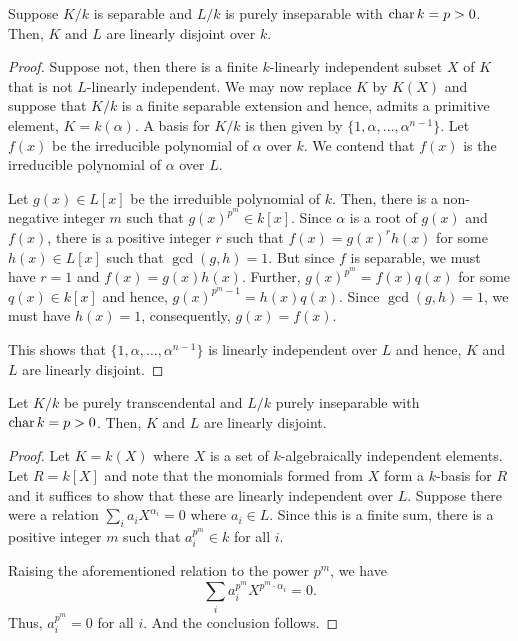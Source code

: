 \begin{proposition}
    Suppose $K/k$ is separable and $L/k$ is purely inseparable with $\operatorname{char} k = p > 0$. Then, $K$ and $L$ are linearly disjoint over $k$.
\end{proposition}
\begin{proof}
    Suppose not, then there is a finite $k$-linearly independent subset $X$ of $K$ that is not $L$-linearly independent. We may now replace $K$ by $K(X)$ and suppose that $K/k$ is a finite separable extension and hence, admits a primitive element, $K = k(\alpha)$. A basis for $K/k$ is then given by $\{1,\alpha,\dots,\alpha^{n - 1}\}$. Let $f(x)$ be the irreducible polynomial of $\alpha$ over $k$. We contend that $f(x)$ is the irreducible polynomial of $\alpha$ over $L$. 

    Let $g(x)\in L[x]$ be the irreduible polynomial of $k$. Then, there is a non-negative integer $m$ such that $g(x)^{p^m}\in k[x]$. Since $\alpha$ is a root of $g(x)$ and $f(x)$, there is a positive integer $r$ such that $f(x) = g(x)^rh(x)$ for some $h(x)\in L[x]$ such that $\gcd(g,h) = 1$. But since $f$ is separable, we must have $r = 1$ and $f(x) = g(x)h(x)$. Further, $g(x)^{p^m} = f(x)q(x)$ for some $q(x)\in k[x]$ and hence, $g(x)^{p^m - 1} = h(x)q(x)$. Since $\gcd(g,h) = 1$, we must have $h(x) = 1$, consequently, $g(x) = f(x)$.

    This shows that $\{1,\alpha,\dots,\alpha^{n - 1}\}$ is linearly independent over $L$ and hence, $K$ and $L$ are linearly disjoint.
\end{proof}

\begin{proposition}
    Let $K/k$ be purely transcendental and $L/k$ purely inseparable with $\operatorname{char} k = p > 0$. Then, $K$ and $L$ are linearly disjoint.
\end{proposition}
\begin{proof}
    Let $K = k(X)$ where $X$ is a set of $k$-algebraically independent elements. Let $R = k[X]$ and note that the monomials formed from $X$ form a $k$-basis for $R$ and it suffices to show that these are linearly independent over $L$. Suppose there were a relation $\sum_{i} a_i X^{\alpha_i} = 0$ where $a_i\in L$. Since this is a finite sum, there is a positive integer $m$ such that $a_i^{p^m}\in k$ for all $i$. 

    Raising the aforementioned relation to the power $p^m$, we have 
    \begin{equation*}
        \sum_{i} a_i^{p^m} X^{p^m\cdot\alpha_i} = 0.
    \end{equation*}
    Thus, $a_i^{p^m} = 0$ for all $i$. And the conclusion follows.
\end{proof}

